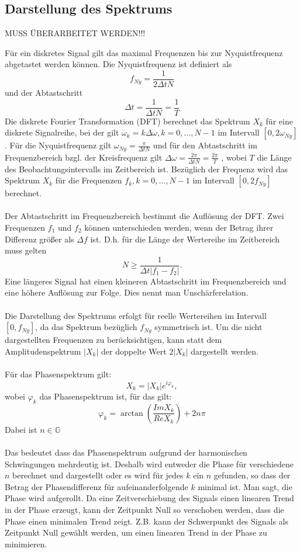 \subsection{Darstellung des Spektrums}
{\color{red} MUSS ÜBERARBEITET WERDEN!!!}


Für ein diskretes Signal gilt das maximal Frequenzen bis zur Nyquistfrequenz abgetastet werden können. Die Nyquistfrequenz ist definiert als
\begin{equation}
f_{Ny} = \frac {1} {2 \Delta t N}
\end{equation}
und der Abtastschritt
\[
\Delta t =\frac{1}{\Delta t N} = \frac{1}{T}
\]
Die diskrete Fourier Transformation (DFT) berechnet das Spektrum $X_k$ für eine diskrete Signalreihe, bei der gilt $\omega_k= k \Delta \omega, k=0,\dots, N-1$ im Intervall $[0,2\omega_{Ny}]$. Für die Nyquistfrequenz gilt $\omega_{Ny} = \frac {\pi} {\Delta t N}$ und für den Abtastschritt im Frequenzbereich bzgl. der Kreisfrequenz gilt $\Delta\omega=\frac{2\pi}{\Delta t N} = \frac{2\pi}{T}$ , wobei $T$ die Länge des Beobachtungsintervalls im Zeitbereich ist. Bezüglich der Frequenz wird das Spektrum $X_k$ für die Frequenzen  $f_k, k=0,\dots, N-1$ im Intervall $[0,2f_{Ny}]$ berechnet.\\\\
Der Abtastschritt im Frequenzbereich bestimmt die Auflösung der DFT. Zwei Frequenzen $f_1$ und $f_2$ können unterschieden werden, wenn der Betrag ihrer Differenz größer als $ \Delta f$ ist. D.h. für die Länge der Wertereihe im Zeitbereich muss  gelten
\[
N \ge \frac{1}{\Delta t | f_1 - f_2 |}.
\]
Eine längeres Signal hat einen kleineren Abtastschritt im Frequenzbereich und eine höhere Auflösung zur Folge. Dies nennt man Unschärferelation.\\\\
Die Darstellung des Spektrums erfolgt für reelle Wertereihen im Intervall $[0,f_{Ny}]$, da das Spektrum bezüglich $f_{Ny}$ symmetrisch ist. Um die nicht dargestellten Frequenzen zu berücksichtigen, kann statt dem Amplitudenspektrum $|X_k|$ der doppelte Wert $2|X_k|$ dargestellt werden.\\\\
Für das Phasenspektrum gilt:
\[
X_k= |X_k|e^{i\varphi_k},
\]
wobei $\varphi_k$ das Phasenspektrum ist, für das gilt:
\[
\varphi_k = \arctan \left(\frac{Im X_k}{Re X_k}\right) + 2n\pi
\]
{\small Dabei ist $n \in \mathbb{G}$}\\\\
Das bedeutet dass das Phasenspektrum aufgrund der harmonischen Schwingungen mehrdeutig ist. Deshalb wird entweder die Phase für verschiedene $n$ berechnet und dargestellt oder es wird für jedes $k$ ein $n$ gefunden, so dass der Betrag der Phasendifferenz für aufeinanderfolgende $k$ minimal ist. Man sagt, die Phase wird aufgerollt. Da eine Zeitverschiebung des Signals einen linearen Trend in der Phase erzeugt, kann der Zeitpunkt Null so verschoben werden, dass die Phase einen minimalen Trend zeigt. Z.B. kann der Schwerpunkt des Signals als Zeitpunkt Null gewählt werden, um einen linearen Trend in der Phase zu minimieren.

